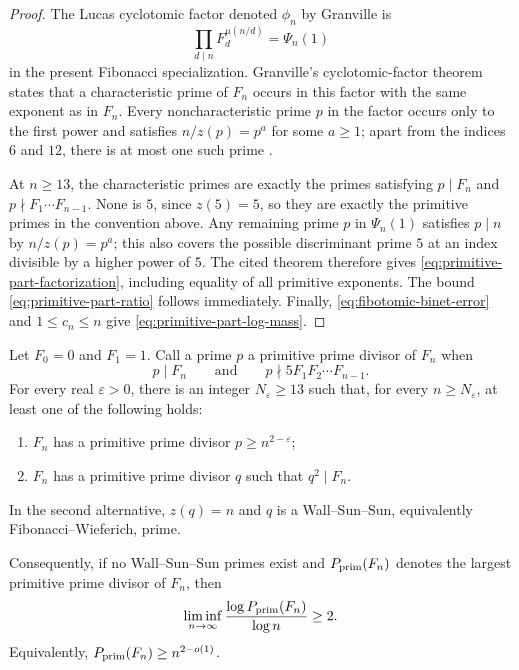 \begin{proof}
The Lucas cyclotomic factor denoted $\phi_n$ by Granville is
\[
 \prod_{d\mid n}F_d^{\mu(n/d)}=\Psi_n(1)
\]
in the present Fibonacci specialization.  Granville's cyclotomic-factor
theorem states that a characteristic prime of $F_n$ occurs in this factor
with the same exponent as in $F_n$.  Every noncharacteristic prime $p$ in
the factor occurs only to the first power and satisfies
$n/z(p)=p^a$ for some $a\geq1$; apart from the indices $6$ and $12$, there
is at most one such prime
\cite[Corollaries~3 and~4]{Granville2012PrimitivePrimeFactors}.

At $n\geq13$, the characteristic primes are exactly the primes satisfying
$p\mid F_n$ and $p\nmid F_1\cdots F_{n-1}$.  None is $5$, since $z(5)=5$,
so they are exactly the primitive primes in the convention above.  Any
remaining prime $p$ in $\Psi_n(1)$ satisfies $p\mid n$ by
$n/z(p)=p^a$; this also covers the possible discriminant prime $5$ at an
index divisible by a higher power of $5$.  The cited theorem therefore gives
\eqref{eq:primitive-part-factorization}, including equality of all primitive
exponents.  The bound \eqref{eq:primitive-part-ratio} follows immediately.
Finally, \eqref{eq:fibotomic-binet-error} and
$1\leq c_n\leq n$ give \eqref{eq:primitive-part-log-mass}.
\end{proof}

\begin{theorem}
\label{thm:large-primitive-wieferich-alternative}
Let $F_0=0$ and $F_1=1$.  Call a prime $p$ a primitive prime divisor of
$F_n$ when
\[
 p\mid F_n\qquad\text{and}\qquad p\nmid 5F_1F_2\cdots F_{n-1}.
\]
For every real $\varepsilon>0$, there is an integer
$N_\varepsilon\geq13$ such that, for every $n\geq N_\varepsilon$, at least
one of the following holds:
\begin{enumerate}[label=\textup{(\roman*)}]
\item $F_n$ has a primitive prime divisor $p\geq n^{2-\varepsilon}$;
\item $F_n$ has a primitive prime divisor $q$ such that $q^2\mid F_n$.
\end{enumerate}
In the second alternative, $z(q)=n$ and $q$ is a Wall--Sun--Sun,
equivalently Fibonacci--Wieferich, prime.

Consequently, if no Wall--Sun--Sun primes exist and
$P_{\rm prim}(F_n)$ denotes the largest primitive prime divisor of $F_n$,
then
\[
 \liminf_{n\to\infty}
 \frac{\log P_{\rm prim}(F_n)}{\log n}\geq2.
\]
Equivalently, $P_{\rm prim}(F_n)\geq n^{2-o(1)}$.
\end{theorem}


